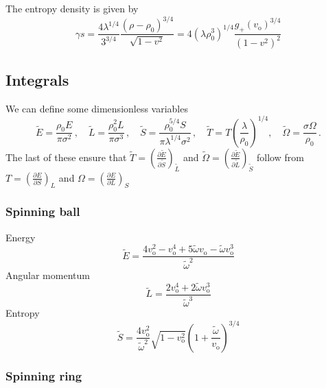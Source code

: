 \documentclass[12pt,a4paper]{article}
\newcommand{\prn}[1]{\left ( #1 \right )}
\newcommand{\pdiffc}[3][\rule{0mm}{0mm}]{\left (\frac{\partial #2}{\partial {#3}}\right )_{\!\!#1}}
\newcommand{\dr}{\mathrm{d}}
\newcommand{\rz}{\rho_0}
\newcommand{\tE}{\widetilde{E}}
\newcommand{\tL}{\widetilde{L}}
\newcommand{\tS}{\widetilde{S}}
\newcommand{\tT}{\widetilde{T}}
\newcommand{\tO}{\widetilde{\Omega}}
\newcommand{\vo}{v_\mathrm{o}}
\newcommand{\z}{\tilde{r}}
\newcommand{\zo}{\z_\mathrm{o}}
\newcommand{\tw}{\widetilde{\omega}}
\begin{document}
The entropy density is given by
%
\begin{equation}\label{Sdens:eq}
  \gamma s =
  \frac{4\lambda^{1/4}}{3^{3/4}}\frac{(\rho-\rz)^{3/4}}{\sqrt{1-v^2}} =
  4(\lambda\rz^3)^{1/4}\frac{g_+(\vo)^{3/4}}{(1-v^2)^{2}}
\end{equation}
%

\subsection{Integrals}\label{sec:ints}
%

We can define some dimensionless variables
%
\begin{equation}\label{redch:eq}
  \tE = \frac{\rz E}{\pi\sigma^2} \,,\quad
  \tL = \frac{\rz^2 L}{\pi\sigma^3} \,,\quad
  \tS = \frac{\rz^{5/4}S}{\pi\lambda^{1/4}\sigma^2} \,,\quad
  \tT = T\prn{\frac{\lambda}{\rz}}^{1/4},\quad
  \tO = \frac{\sigma\Omega}{\rz}\,.
\end{equation}
%
The last of these ensure that $\tT = \pdiffc[\tL]{\tE}{\tS}$ and
$\tO = \pdiffc[\tS]{\tE}{\tL}$ follow from $T = \pdiffc[L]{E}{S}$
and $\Omega = \pdiffc[S]{E}{L}$


\subsubsection{Spinning ball}\label{sec:ballch}

Energy
%
\begin{equation}\label{ballE:eq}
  \tE = \frac{4\vo^2-\vo^4+5\tw \vo-\tw \vo^3}{\tw^2}
\end{equation}
%
Angular momentum
%
\begin{equation}\label{ballL:eq}
  \tL = \frac{2\vo^4+2\tw \vo^3}{\tw^3}
\end{equation}
%
Entropy
%
\begin{equation}\label{ballS:eq}
  \tS = \frac{4\vo^2}{\tw^2}\sqrt{1-\vo^2}
         \prn{1+\frac{\tw}{\vo}}^{3/4}
\end{equation}
%

\subsubsection{Spinning ring}\label{sec:ringch}
\end{document}
